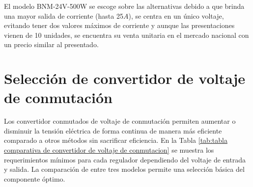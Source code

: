 El modelo BNM-24V-500W se escoge sobre las alternativas debido a que brinda una mayor salida de corriente (hasta 25$A$), se centra en un único voltaje, evitando tener dos valores máximos de corriente y aunque las presentaciones vienen de 10 unidades, se encuentra su venta unitaria en el mercado nacional con un precio similar al presentado.

\section{Selección de convertidor de voltaje de conmutación}

Los convertidor conmutados de voltaje de conmutación permiten aumentar o disminuir la tensión eléctrica de forma continua de manera más eficiente comparado a otros métodos sin sacrificar eficiencia. En la Tabla \ref{tab:tabla comparativa de convertidor de voltaje de conmutacion} se muestra los requerimientos mínimos para cada regulador dependiendo del voltaje de entrada y salida. La comparación de entre tres modelos permite una selección básica del componente óptimo.





